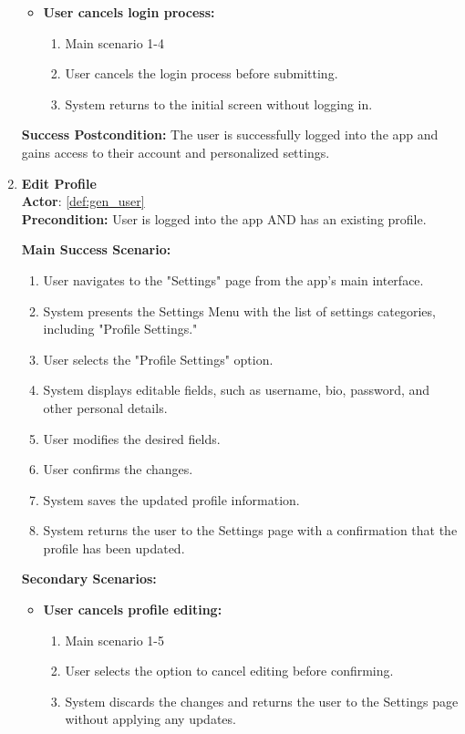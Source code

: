 \documentclass{article}
\begin{document}
\begin{enumerate}[label=\textbf{UC\arabic*}]
\begin{itemize}
            \item[{}] \textbf{User cancels login process:}
            \begin{enumerate}[label=\textbf{\arabic*.}]
                \item Main scenario 1-4
                \item User cancels the login process before submitting.
                \item System returns to the initial screen without logging in.
            \end{enumerate}
        \end{itemize}
        
        \textbf{Success Postcondition:} The user is successfully logged into the app and gains access to their account and personalized settings.

    \item \label{uc:25} \textbf{Edit Profile} \\
        \textbf{Actor}: \ref{def:gen_user} \\
        \textbf{Precondition:} User is logged into the app AND has an existing profile.
    
        \textbf{Main Success Scenario:}
        \begin{enumerate}[label=\textbf{\arabic*.}]
            \item User navigates to the "Settings" page from the app’s main interface.
            \item System presents the Settings Menu with the list of settings categories, including "Profile Settings."
            \item User selects the "Profile Settings" option.
            \item System displays editable fields, such as username, bio, password, and other personal details.
            \item User modifies the desired fields.
            \item User confirms the changes.
            \item System saves the updated profile information.
            \item System returns the user to the Settings page with a confirmation that the profile has been updated.
        \end{enumerate}
        
        \textbf{Secondary Scenarios:}
        \begin{itemize}
            \item[{}] \textbf{User cancels profile editing:}
            \begin{enumerate}[label=\textbf{\arabic*.}]
                \item Main scenario 1-5
                \item User selects the option to cancel editing before confirming.
                \item System discards the changes and returns the user to the Settings page without applying any updates.
            \end{enumerate}
            

\end{itemize}
\end{enumerate}
\end{document}

